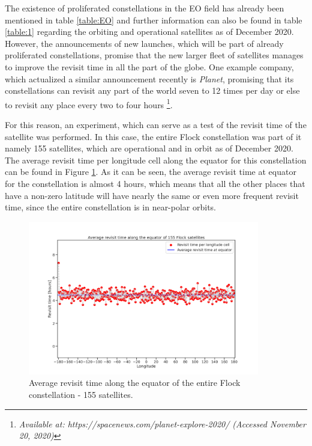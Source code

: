 The existence of proliferated constellations in the EO field has already been mentioned in table \ref{table:EO} and further information can also be found in table \ref{table:1} regarding the orbiting and operational satellites as of December 2020. However, the announcements of new launches, which will be part of already proliferated constellations, promise that the new larger fleet of satellites manages to improve the revisit time in all the part of the globe. One example company, which actualized a similar announcement recently is \textit{Planet}, promising that its constellations can revisit any part of the world seven to 12 times per day or else to revisit any place every two to four hours \footnote{\label{Flock_source}\textit{Available at: https://spacenews.com/planet-explore-2020/ (Accessed November 20, 2020)}}.

For this reason, an experiment, which can serve as a test of the revisit time of the satellite was performed. In this case, the entire Flock constellation was part of it namely 155 satellites, which are operational and in orbit as of December 2020. The average revisit time per longitude cell along the equator for this constellation can be found in Figure \ref{revisit_time_hours_of_155_Flocks}. As it can be seen, the average revisit time at equator for the constellation is almost 4 hours, which means that all the other places that have a non-zero latitude will have nearly the same or even more frequent revisit time, since the entire constellation is in near-polar orbits. 

\begin{figure}[!htb]
\centering
\includegraphics[width=0.9\textwidth]{Images/revisit_time_hours_of_155_Flocks.png}
\caption{Average revisit time along the equator of the entire Flock constellation - 155 satellites.}
\label{revisit_time_hours_of_155_Flocks}
\end{figure}

